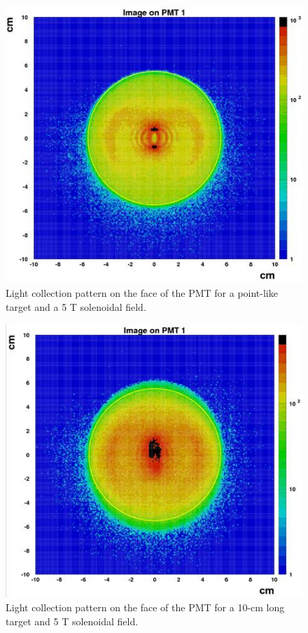 \begin{figure}[!ht]
    \centering
    \includegraphics[width=1.0\linewidth,trim={0.0cm 0.0cm 0.0cm 0.0cm},clip]{images/Point_Targ_5T_Field_PMT.jpg}
    \caption{Light collection pattern on the face of the PMT for a point-like target and a 5 T solenoidal field.}
    \label{fig:Point_Targ_5T_Field_PMT}
\end{figure}

\begin{figure}[!ht]
    \centering
    \includegraphics[width=1.0\linewidth,trim={0.0cm 0.0cm 0.0cm 0.0cm},clip]{images/10cm_Targ_5T_Field_PMT.jpg}
    \caption{Light collection pattern on the face of the PMT for a 10-cm long target and 5 T solenoidal field.}
    \label{fig:10cm_Targ_5T_Field_PMT}
\end{figure}

